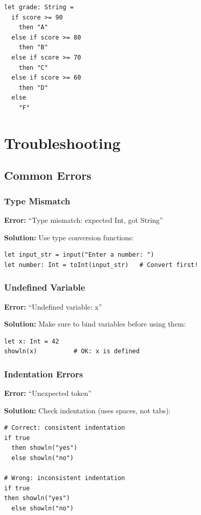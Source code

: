 \documentclass[11pt,twoside,openright]{book}
\begin{document}
\begin{lstlisting}[language=ConstructLang]
let grade: String =
  if score >= 90
    then "A"
  else if score >= 80
    then "B"
  else if score >= 70
    then "C"
  else if score >= 60
    then "D"
  else
    "F"
\end{lstlisting}

\chapter{Troubleshooting}

\section{Common Errors}

\subsection{Type Mismatch}

\textbf{Error:} ``Type mismatch: expected Int, got String''

\textbf{Solution:} Use type conversion functions:

\begin{lstlisting}[language=ConstructLang]
let input_str = input("Enter a number: ")
let number: Int = toInt(input_str)   # Convert first!
\end{lstlisting}

\subsection{Undefined Variable}

\textbf{Error:} ``Undefined variable: x''

\textbf{Solution:} Make sure to bind variables before using them:

\begin{lstlisting}[language=ConstructLang]
let x: Int = 42
showln(x)          # OK: x is defined
\end{lstlisting}

\subsection{Indentation Errors}

\textbf{Error:} ``Unexpected token''

\textbf{Solution:} Check indentation (uses spaces, not tabs):

\begin{lstlisting}[language=ConstructLang]
# Correct: consistent indentation
if true
  then showln("yes")
  else showln("no")

# Wrong: inconsistent indentation
if true
then showln("yes")
  else showln("no")
\end{lstlisting}
\end{document}
